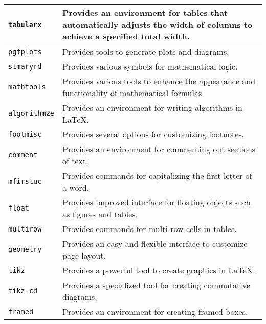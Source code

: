 \documentclass[11pt]{article}
\begin{document}
\begin{tabularx}{\linewidth}{|X|X|}
		\hline
		\verb|tabularx|         & Provides an environment for tables that automatically adjusts the width of columns to achieve a specified total width. \\
		\hline
		\verb|pgfplots|         & Provides tools to generate plots and diagrams.                                                                         \\
		\hline
		\verb|stmaryrd|         & Provides various symbols for mathematical logic.                                                                       \\
		\hline
		\verb|mathtools|        & Provides various tools to enhance the appearance and functionality of mathematical formulas.                           \\
		\hline
		\verb|algorithm2e|      & Provides an environment for writing algorithms in LaTeX.                                                               \\
		\hline
		\verb|footmisc|         & Provides several options for customizing footnotes.                                                                    \\
		\hline
		\verb|comment|          & Provides an environment for commenting out sections of text.                                                           \\
		\hline
		\verb|mfirstuc|         & Provides commands for capitalizing the first letter of a word.                                                         \\
		\hline
		\verb|float|            & Provides improved interface for floating objects such as figures and tables.                                           \\
		\hline
		\verb|multirow|         & Provides commands for multi-row cells in tables.                                                                       \\
		\hline
		\verb|geometry|         & Provides an easy and flexible interface to customize page layout.                                                      \\
		\hline
		\verb|tikz|             & Provides a powerful tool to create graphics in LaTeX.                                                                  \\
		\hline
		\verb|tikz-cd|          & Provides a specialized tool for creating commutative diagrams.                                                         \\
		\hline
		\verb|framed|           & Provides an environment for creating framed boxes.                                                                     \\
		\hline
	\end{tabularx}
\end{document}
